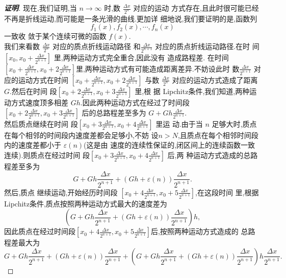 \documentclass[a4paper]{article}
\begin{document}
\begin{proof}[\textbf{证明}]
现在,我们证明,当 $n\to\infty$ 时,数 $\frac{\Delta x}{2^n}$ 对应的运动
方式存在,且此时很可能已经不再是折线运动,而可能是一条光滑的曲线.更加详
细地说,我们要证明的是,函数列 $$ f_1(x),f_2(x),\cdots,f_n(x) $$ 一致收
敛于某个连续可微的函数 $f(x)$.\\
 
 
我们来看数 $\frac{\Delta x}{2^n}$ 对应的质点折线运动路径
和$\frac{\Delta x}{2^{n+1}}$ 对应的质点折线运动路径.在时
间$[x_0,x_0+\frac{\Delta x}{2^{n+1}}]$ 里,两种运动方式完全重合,因此没有
造成路程差. 在时间 $[x_0+\frac{\Delta x}{2^{n+1}},x_0+2\frac{\Delta
  x}{2^{n+1}}]$里,两种运动方式有可能造成距离差异.不妨设此时
数$\frac{\Delta x}{2^{n+1}}$ 对应的运动方式在时间 $[x_0+\frac{\Delta
  x}{2^{n+1}},x_0+2\frac{\Delta x}{2^{n+1}}]$ 与数 $\frac{\Delta
  x}{2^n}$ 对应的运动方式造成了距离 $G$.然后在时间
段$[x_0+2\frac{\Delta x}{2^{n+1}},x_0+3\frac{\Delta x}{2^{n+1}}]$ 里,根
据 Lipchitz条件,我们知道,两种运动方式速度顶多相差 $Gh$.因此两种运动方式在经过了时间段 $[x_0+2\frac{\Delta
  x}{2^{n+1}},x_0+3\frac{\Delta x}{2^{n+1}}]$ 后的总路程差至多为 $
G+Gh\frac{\Delta x}{2^{n+1}}$.\\

 然后质点继续在时间
段$[x_0+3\frac{\Delta x}{2^{n+1}},x_0+4\frac{\Delta x}{2^{n+1}}]$ 里运
动.由于当 $n$ 足够大时,质点在每个相邻的时间段内速度差都会足够小,不妨
设$n>N$,且质点在每个相邻时间段内的速度差都小于 $\varepsilon(n)$(这是由
速度的连续性保证的,闭区间上的连续函数一致连续).则质点在经过时间
段$[x_0+3\frac{\Delta x}{2^{n+1}},x_0+4\frac{\Delta x}{2^{n+1}}]$ 后,两
种运动方式造成的总路程差至多为 $$ G+Gh\frac{\Delta
  x}{2^{n+1}}+(Gh+\varepsilon(n))\frac{\Delta x}{2^{n+1}}. $$ 然后,质点
继续运动,开始经历时间段 $[x_0+4\frac{\Delta
  x}{2^{n+1}},x_0+5\frac{\Delta x}{2^{n+1}}]$,在这段时间
里,根据Lipchitz条件,质点按照两种运动方式最大的速度差为 $$
(G+Gh\frac{\Delta x}{2^{n+1}}+(Gh+\varepsilon(n))\frac{\Delta
  x}{2^{n+1}})h, $$ 因此质点在经过时间段$[x_0+4\frac{\Delta
  x}{2^{n+1}},x_0+5\frac{\Delta x}{2^{n+1}}]$后,按照两种运动方式造成的
总路程差最大为 $$ G+Gh\frac{\Delta
  x}{2^{n+1}}+(Gh+\varepsilon(n))\frac{\Delta
  x}{2^{n+1}}+(G+Gh\frac{\Delta
  x}{2^{n+1}}+(Gh+\varepsilon(n))\frac{\Delta
  x}{2^{n+1}})h\frac{\Delta x}{2^{n+1}}. $$



\end{proof}
\end{document}
